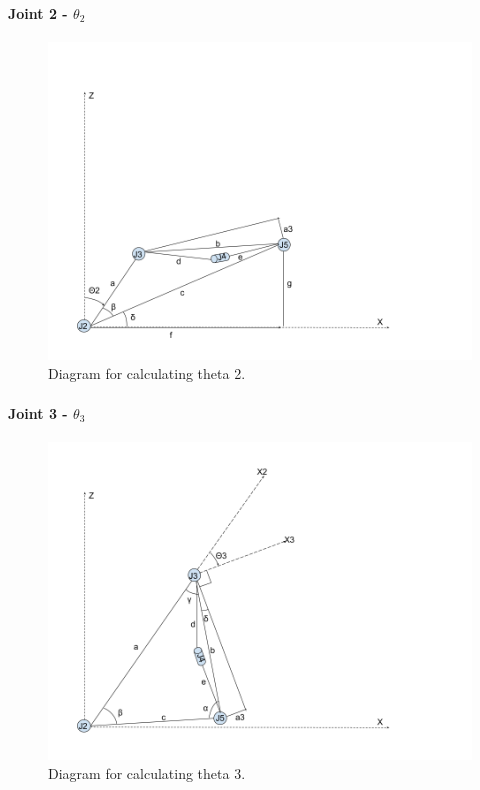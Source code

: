 \documentclass{article}
\begin{document}
\paragraph{Joint 2 - $\theta _2$}
\begin{figure}[H]
    \includegraphics[width=\linewidth]{theta2.png}
    \caption{Diagram for calculating theta 2.}
    \label{fig:theta3}
\end{figure}

\paragraph{Joint 3 - $\theta _3$}
\begin{figure}[H]
    \includegraphics[width=\linewidth]{theta3.png}
    \caption{Diagram for calculating theta 3.}
    \label{fig:theta3}
\end{figure}
\end{document}
